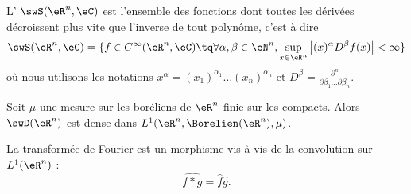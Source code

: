 L' \( \swS(\eR^n,\eC)\) est l'ensemble des fonctions dont toutes les dérivées décroissent plus vite que l'inverse de tout polynôme, c'est à dire
\begin{equation}
    \swS(\eR^n,\eC)=\{ f\in C^{\infty}(\eR^n,\eC)\tq \forall \alpha,\beta\in \eN^n,\sup_{x\in \eR^n}\big| (x)^{\alpha}D^{\beta}f(x) \big|<\infty \}
\end{equation}
où nous utilisons les notations \( x^{\alpha}=(x_1)^{\alpha_1}\ldots (x_n)^{\alpha_n}\) et \( D^{\beta}=\frac{ \partial^n  }{ \partial \beta_1\ldots\partial \beta_n }\).

\begin{theorem}      \label{ThoRWEoqY}
    Soit \( \mu\) une mesure sur les boréliens de \( \eR^n\) finie sur les compacts. Alors \( \swD(\eR^n)\) est dense dans \( L^1(\eR^n,\Borelien(\eR^n),\mu)\).
\end{theorem}

\begin{proposition}     \label{PropfqvLOl}
    La transformée de Fourier est un morphisme vis-à-vis de la convolution sur \( L^1(\eR^n)\) :
    \begin{equation}
        \widehat{f*g}=\hat f\hat g.
    \end{equation}
\end{proposition}

